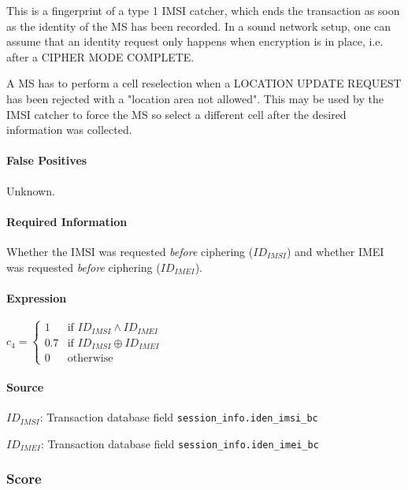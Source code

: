 \documentclass[a4paper,11pt,notitlepage,bigheadings,oneside]{scrartcl}
\begin{document}
This is a fingerprint of a type 1 IMSI catcher, which ends the transaction as
soon as the identity of the MS has been recorded. In a sound network setup, one
can assume that an identity request only happens when encryption is in place,
i.e. after a CIPHER MODE COMPLETE.

A MS has to perform a cell reselection when a LOCATION UPDATE REQUEST has been
rejected with a "location area not allowed". This may be used by the IMSI
catcher to force the MS so select a different cell after the desired
information was collected.

\paragraph{False Positives}

Unknown.

\paragraph{Required Information}

Whether the IMSI was requested \emph{before} ciphering ($ID_{IMSI}$) and
whether IMEI was requested \emph{before} ciphering ($ID_{IMEI}$).


\paragraph{Expression}

$c_4 =
\begin{cases}
	1 	& \text{if } ID_{IMSI} \wedge ID_{IMEI} \\
	0.7     & \text{if } ID_{IMSI} \oplus ID_{IMEI} \\
	0       & \text{otherwise}
\end{cases}$

\paragraph{Source}

$ID_{IMSI}$: Transaction database field \verb|session_info.iden_imsi_bc|

$ID_{IMEI}$: Transaction database field \verb|session_info.iden_imei_bc|

\subsubsection{Score}
\end{document}
